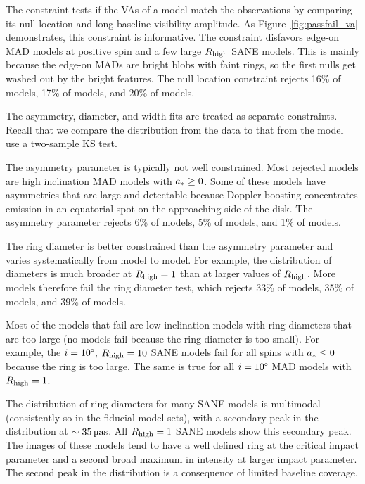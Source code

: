 The \vam constraint tests if the VAs of a model match the
observations by comparing its null location and long-baseline visibility
amplitude.
As Figure~\ref{fig:passfail_va} demonstrates, this constraint is
informative.
The constraint disfavors edge-on MAD models at positive spin and a few large $R_\mathrm{high}$ SANE models.
This is mainly because the edge-on MADs are bright blobs with faint rings, so the first nulls get washed out by the bright features.
The null location constraint rejects 16\% of \kharma models, 17\% of \bhac models, and 20\% of \hamr models.

\label{sec:mring}

The \mring asymmetry, diameter, and width fits are treated as separate constraints.
Recall that we compare the distribution from the data to that from the model use a two-sample KS test.

The asymmetry parameter is typically not well constrained.
Most rejected models are high inclination MAD models with $a_* \ge 0$.
Some of these models have asymmetries that are large and detectable because Doppler boosting concentrates emission in an equatorial spot on the approaching side of the disk.
The asymmetry parameter rejects 6\% of \kharma models, 5\% of \bhac models, and 1\% of \hamr models.

The ring diameter is better constrained than the asymmetry parameter and varies systematically from model to model.
For example, the distribution of diameters is much broader at $R_\mathrm{high} = 1$ than at larger values of $R_\mathrm{high}$.
More models therefore fail the ring diameter test, which rejects 33\% of \kharma models, 35\% of \bhac models, and 39\% of \hamr models.

Most of the models that fail are low inclination models with ring diameters that are too large (no models fail because the ring diameter is too small).
For example, the $i = 10\degree$, $R_\mathrm{high} = 10$ SANE models fail for all spins with $a_* \le 0$ because the ring is too large.
The same is true for all $i = 10\degree$ MAD models with $R_\mathrm{high} = 1$.

The distribution of ring diameters for many SANE models is multimodal (consistently so in the fiducial model sets), with a secondary peak in the distribution at $\sim 35\uas$.
All $R_\mathrm{high} = 1$ SANE models show this secondary peak.
The images of these models tend to have a well defined ring at the critical impact parameter and a second broad maximum in intensity at larger impact parameter.
The second peak in the distribution is a consequence of limited baseline coverage.

